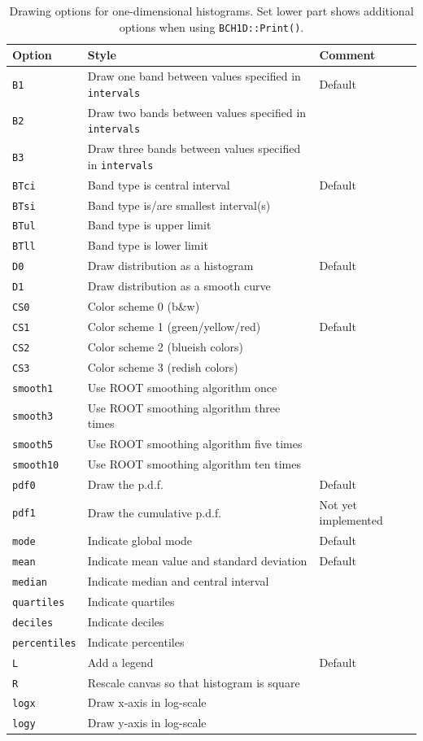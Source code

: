 \documentclass[11pt, a4paper]{article}
\begin{document}
\begin{table}[ht!]
\caption{Drawing options for one-dimensional histograms. Set lower
  part shows additional options when using \texttt{BCH1D::Print()}.
\label{table:draw1d}}
\begin{center}
\begin{tabular}{lll}
\toprule
Option & Style & Comment \\
\midrule
\verb|B1| & Draw one band between values specified in \verb|intervals| & Default  \\
\verb|B2| & Draw two bands between values specified in \verb|intervals| & \\
\verb|B3| & Draw three bands between values specified in \verb|intervals| & \\
\verb|BTci| & Band type is central interval & Default \\
\verb|BTsi| & Band type is/are smallest interval(s) & \\
\verb|BTul| & Band type is upper limit & \\
\verb|BTll| & Band type is lower limit & \\
\verb|D0| & Draw distribution as a histogram & Default \\
\verb|D1| & Draw distribution as a smooth curve & \\
\verb|CS0| & Color scheme 0 (b\&w) & \\
\verb|CS1| & Color scheme 1 (green/yellow/red) & Default  \\
\verb|CS2| & Color scheme 2 (blueish colors) &  \\
\verb|CS3| & Color scheme 3 (redish colors) & \\
\verb|smooth1| & Use ROOT smoothing algorithm once & \\
\verb|smooth3| & Use ROOT smoothing algorithm three times & \\
\verb|smooth5| & Use ROOT smoothing algorithm five times & \\
\verb|smooth10| & Use ROOT smoothing algorithm ten times & \\
\verb|pdf0| & Draw the p.d.f. & Default  \\
\verb|pdf1| & Draw the cumulative p.d.f. & Not yet implemented \\
\verb|mode| & Indicate global mode & Default \\
\verb|mean| & Indicate mean value and standard deviation & Default \\
\verb|median| & Indicate median and central interval &  \\
\verb|quartiles| & Indicate quartiles & \\
\verb|deciles| & Indicate deciles & \\
\verb|percentiles| & Indicate percentiles & \\
\verb|L| & Add a legend & Default \\
\midrule
\verb|R| & Rescale canvas so that histogram is square & \\
\verb|logx| & Draw x-axis in log-scale & \\
\verb|logy| & Draw y-axis in log-scale & \\
\bottomrule
\end{tabular}
\end{center}
\end{table}
\end{document}

